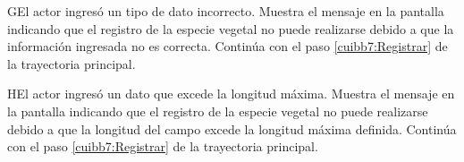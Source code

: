         \begin{UCtrayectoriaA}{G}{El actor ingresó un tipo de dato incorrecto.}    
    \UCpaso[\UCsist] Muestra el mensaje  en la pantalla  indicando que el registro de la especie vegetal no puede realizarse debido a que la información ingresada no es correcta.
    \UCpaso[] Continúa con el paso \ref{cuibb7:Registrar} de la trayectoria principal.     
    \end{UCtrayectoriaA}
    
            \begin{UCtrayectoriaA}{H}{El actor ingresó un dato que excede la longitud máxima.}    
    \UCpaso[\UCsist] Muestra el mensaje  en la pantalla  indicando que el registro de la especie vegetal no puede realizarse debido a que la longitud del campo excede la longitud máxima definida.
    \UCpaso[] Continúa con el paso \ref{cuibb7:Registrar} de la trayectoria principal.     
    \end{UCtrayectoriaA}
